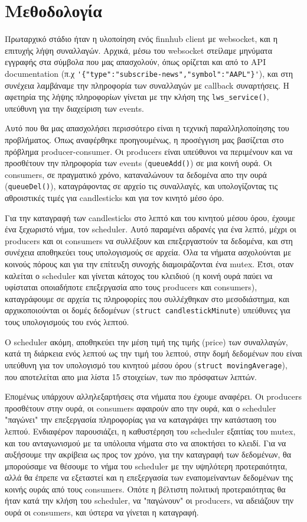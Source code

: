 \documentclass[12pt, a4paper]{article}
\begin{document}
\section{Μεθοδολογία}

Πρωταρχικό στάδιο ήταν η υλοποίηση ενός finnhub client με websocket, και η επιτυχής λήψη συναλλαγών. Αρχικά, μέσω του websocket στείλαμε μηνύματα εγγραφής στα σύμβολα που μας απασχολούν, όπως ορίζεται και από το API documentation (π.χ \verb|'{"type":"subscribe-news","symbol":"AAPL"}'|), και στη συνέχεια λαμβάναμε την πληροφορία των συναλλαγών με callback συναρτήσεις. Η αφετηρία της λήψης πληροφορίων γίνεται με την κλήση της \verb|lws_service()|, υπεύθυνη για την διαχείριση των events.

Αυτό που θα μας απασχολήσει περισσότερο είναι η τεχνική παραλληλοποίησης του προβλήματος. Όπως αναφέρθηκε προηγουμένως, η προσέγγιση μας βασίζεται στο πρόβλημα producer-consumer. Οι producers είναι υπεύθυνοι να περιμένουν και να προσθέτουν την πληροφορία των events (\verb|queueAdd()|) σε μια κοινή ουρά. Οι consumers, σε πραγματικό χρόνο, καταναλώνουν τα δεδομένα απο την ουρά (\verb|queueDel()|), καταγράφοντας σε αρχείο τις συναλλαγές, και υπολογίζοντας τις αθροιστικές τιμές για candlesticks και για τον κινητό μέσο όρο.

Για την καταγραφή των candlesticks στο λεπτό και του κινητού μέσου όρου, έχουμε ένα ξεχωριστό νήμα, τον scheduler. Αυτό παραμένει αδρανές για ένα λεπτό, μέχρι οι producers και οι consumers να συλλέξουν και επεξεργαστούν τα δεδομένα, και στη συνέχεια αποθηκεύει τους υπολογισμούς σε αρχεία. Όλα τα νήματα ασχολούνται με κοινούς πόρους και για την επίτευξη συνοχής διαμοιράζονται ένα mutex. Έτσι, οταν καλείται ο scheduler και γίνεται κάτοχος του κλειδιού (η κοινή ουρά παύει να υφίσταται οποιαδήποτε επεξεργασία απο τους producers και consumers), καταγράφουμε σε αρχεία τις πληροφορίες που συλλέχθηκαν στο μεσοδιάστημα, και αρχικοποιούνται οι δομές δεδομένων (\verb|struct candlestickMinute|) υπεύθυνες για τους υπολογισμούς του ενός λεπτού.

Ο scheduler ακόμη, αποθηκεύει την μέση τιμή της τιμής (price) των συναλλαγών, κατά τη διάρκεια ενός λεπτού ως την τιμή του λεπτού, στην δομή δεδομένων που είναι υπεύθυνη για τον υπολογισμό του κινητού μέσου όρου (\verb|struct movingAverage|), που αποτελείται απο μια λίστα 15 στοιχείων, των πιο πρόσφατων λεπτών.

Επομένως υπάρχουν αλληλεξαρτήσεις στα νήματα που έχουμε αναφέρει. Οι producers προσθέτουν στην ουρά, οι consumers αφαιρούν απο την ουρά, και ο scheduler "παγώνει" την επεξεργασία πληροφορίας για να καταγράψει την κατάσταση του λεπτού. Ενδιαφέρον παρουσιάζει, η καθυστέρηση του scheduler εξαιτίας του mutex, και του ανταγωνισμού με τα υπόλοιπα νήματα στο να αποκτήσει το κλειδί. Για να αυξήσουμε την ακρίβεια ως προς τον χρόνο, για την καταγραφή των δεδομένων, θα μπορούσαμε να θέσουμε το νήμα του scheduler με την υψηλότερη προτεραιότητα, αλλά θα έπρεπε να εξεταστεί και η επεξεργασία των εναπομείναντων δεδομένων της κοινής ουράς από τους consumers. Οπότε η βέλτιστη πολιτική προτεραιότητας θα ήταν κατά την κλήση του scheduler, να "παγώνουν" οι producers, να αδειάζουν την ουρά οι consumers, και ύστερα να γίνεται η καταγραφή.
\end{document}
